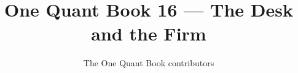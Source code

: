 \documentclass[11pt,a4paper,twoside,openany]{book}
\title{One Quant Book 16 --- The Desk and the Firm}
\author{The One Quant Book contributors}
\date{\bookdate}
\begin{document}
\frontmatter



\tableofcontents

\mainmatter


\appendix
\part{\omsolutionspart}


\backmatter
\printindex
\end{document}
